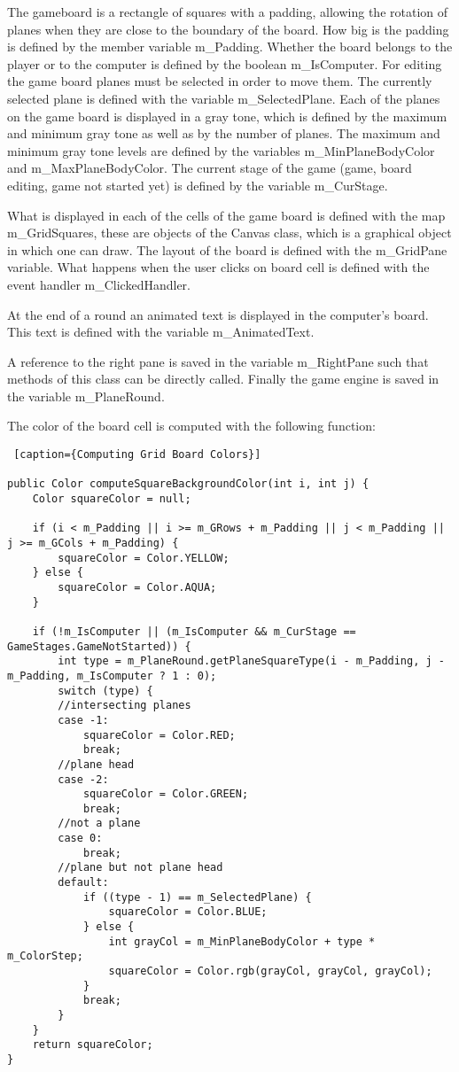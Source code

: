 The gameboard is a rectangle of squares with a padding, allowing the rotation of planes when they are close to the boundary of the board. How big is the padding is defined by the member variable m\_Padding. Whether the board belongs to the player or to the computer is defined by the boolean m\_IsComputer. For editing the game board planes must be selected in order to move them. The currently selected plane is defined with the variable m\_SelectedPlane. Each of the planes on the game board is displayed in a gray tone, which is defined by the maximum and minimum gray tone as well as by the number of planes. The maximum and minimum gray tone levels are defined by the variables m\_MinPlaneBodyColor and m\_MaxPlaneBodyColor. The current stage of the game (game, board editing, game not started yet) is defined by the variable m\_CurStage.

What is displayed in each of the cells of the game board is defined with the map m\_GridSquares, these are objects of the Canvas class, which is a graphical object in which one can draw. The layout of the board is defined with the m\_GridPane variable. What happens when the user clicks on board cell is defined with the event handler m\_ClickedHandler. 

At the end of a round an animated text is displayed in the computer's board. This text is defined with the variable m\_AnimatedText. 

A reference to the right pane is saved in the variable m\_RightPane such that  methods of this class can be directly called. Finally the game engine is saved in the variable m\_PlaneRound.

The color of the board cell is computed with the following function:

\begin{lstlisting} [caption={Computing Grid Board Colors}]

public Color computeSquareBackgroundColor(int i, int j) {
	Color squareColor = null;
	
	if (i < m_Padding || i >= m_GRows + m_Padding || j < m_Padding || j >= m_GCols + m_Padding) {
		squareColor = Color.YELLOW;
	} else {
		squareColor = Color.AQUA;
	}
	
	if (!m_IsComputer || (m_IsComputer && m_CurStage == GameStages.GameNotStarted)) {
		int type = m_PlaneRound.getPlaneSquareType(i - m_Padding, j - m_Padding, m_IsComputer ? 1 : 0);
		switch (type) {					
		//intersecting planes
		case -1:
			squareColor = Color.RED;
			break;								
		//plane head
		case -2:
			squareColor = Color.GREEN;
			break;			
		//not a plane	
		case 0:
			break;					
		//plane but not plane head
		default:
			if ((type - 1) == m_SelectedPlane) {
				squareColor = Color.BLUE;
			} else {
				int grayCol = m_MinPlaneBodyColor + type * m_ColorStep;
				squareColor = Color.rgb(grayCol, grayCol, grayCol);
			}
			break;						
		}
	}
	return squareColor;
}

\end{lstlisting}

